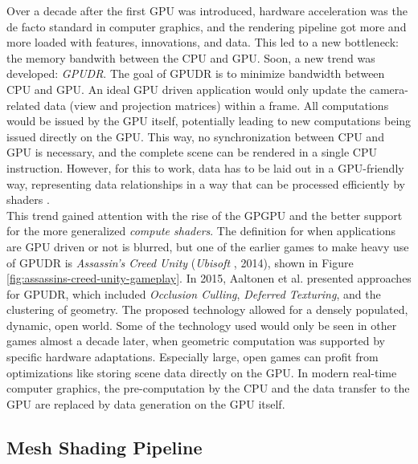 Over a decade after the first \ac{GPU} was introduced, hardware acceleration was the de facto standard in 
computer graphics, and the rendering pipeline got more and more loaded with features, innovations, and data. 
This led to a new bottleneck: the memory bandwith between the \ac{CPU} and \ac{GPU}. Soon, a new trend was 
developed: \emph{\ac{GPUDR}}. The goal of \ac{GPUDR} is to minimize bandwidth between \ac{CPU} and \ac{GPU}. 
An ideal \ac{GPU} driven application would only update the camera-related data (view and projection matrices) 
within a frame. All computations would be issued by the \ac{GPU} itself, potentially leading to new computations 
being issued directly on the \ac{GPU}. This way, no synchronization between \ac{CPU} and \ac{GPU} is necessary, 
and the complete scene can be rendered in a single \ac{CPU} instruction. However, for this to work, data has to 
be laid out in a \ac{GPU}-friendly way, representing data relationships in a way that can be processed 
efficiently by shaders \cite{VKGuide2020}. \\

\noindent
This trend gained attention with the rise of the \ac{GPGPU} and the better support for the more generalized 
\emph{compute shaders}. The definition for when applications are \ac{GPU} driven or not is blurred, but one 
of the earlier games to make heavy use of \ac{GPUDR} is \emph{Assassin's Creed Unity} (\emph{Ubisoft} 
\cite{Ubisoft2014}, 2014), shown in Figure \ref{fig:assassins-creed-unity-gameplay}. In 2015, Aaltonen et al. 
\cite{Aaltonen2015} presented approaches for \ac{GPUDR}, which included \emph{Occlusion Culling},
\emph{Deferred Texturing}, and the clustering of geometry. The proposed technology allowed for a densely populated, 
dynamic, open world. Some of the technology used would only be seen in other games almost a decade later, when 
geometric computation was supported by specific hardware adaptations. Especially large, open games can profit from 
optimizations like storing scene data directly on the \ac{GPU}. In modern real-time computer graphics, the 
pre-computation by the \ac{CPU} and the data transfer to the \ac{GPU} are replaced by data generation on the 
\ac{GPU} itself.

\subsection*{Mesh Shading Pipeline} \label{subsec-mesh-shading-pipeline}



